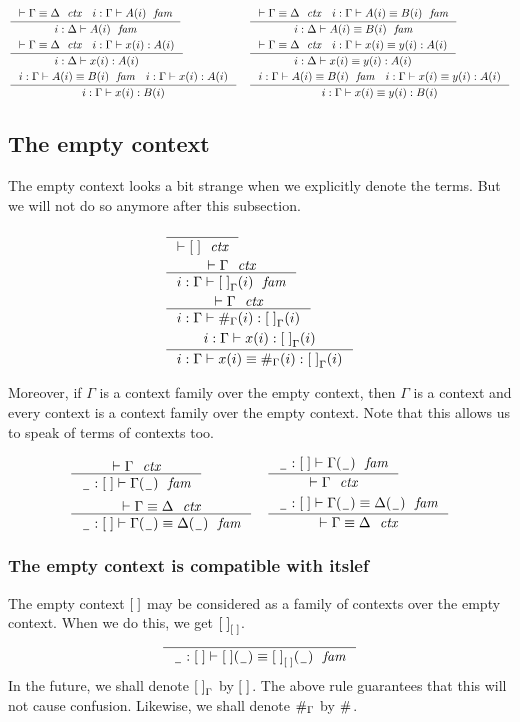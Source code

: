 \begin{align*}
& \inference
  {\jvctxeq{\Gamma}{\Delta}
   \jvfam{i}{\Gamma}{A}}
  {\jvfam{i}{\Delta}{A}}
& & \inference
    {\jvctxeq{\Gamma}{\Delta}
     \jvfameq{i}{\Gamma}{A}{B}}
    {\jvfameq{i}{\Delta}{A}{B}}\\
& \inference
  {\jvctxeq{\Gamma}{\Delta}
   \jvterm{i}{\Gamma}{A}{x}}
  {\jvterm{i}{\Delta}{A}{x}}
& & \inference
    {\jvctxeq{\Gamma}{\Delta}
     \jvtermeq{i}{\Gamma}{A}{x}{y}}
    {\jvtermeq{i}{\Delta}{A}{x}{y}}\\
& \inference
  {\jvfameq{i}{\Gamma}{A}{B}
   \jvterm{i}{\Gamma}{A}{x}}
  {\jvterm{i}{\Gamma}{B}{x}}
& & \inference
    {\jvfameq{i}{\Gamma}{A}{B}
     \jvtermeq{i}{\Gamma}{A}{x}{y}}
    {\jvtermeq{i}{\Gamma}{B}{x}{y}}
\end{align*}

\subsection{The empty context}
The empty context looks a bit strange when we explicitly denote the terms. But
we will not do so anymore after this subsection.

\begin{align}
& \inference
  {}
  {\jctx{\emptyc}}\\
& \inference
  {\jctx{\Gamma}}
  {\jvfam{i}{\Gamma}{\emptyf[\Gamma]}}\\
& \inference
  {\jctx{\Gamma}}
  {\jvterm{i}{\Gamma}{\emptyf[\Gamma]}{\emptytm[\Gamma]}}\\
& \inference
  {\jvterm{i}{\Gamma}{\emptyf[\Gamma]}{x}}
  {\jvtermeq{i}{\Gamma}{\emptyf[\Gamma]}{x}{\emptytm[\Gamma]}}
\end{align}

Moreover, if $\Gamma$ is a context family over the
empty context, then $\Gamma$ is a context and every context is a context
family over the empty context. Note that this allows us to speak
of terms of contexts too.

\begin{align}
& \inference
  {\jctx{\Gamma}}
  {\jvfam{\nameless}{\emptyc}{\Gamma}} 
& & \inference
    {\jvfam{\nameless}{\emptyc}{\Gamma}}
    {\jctx{\Gamma}}\\
& \inference
  {\jctxeq{\Gamma}{\Delta}}
  {\jvfameq{\nameless}{\emptyc}{\Gamma}{\Delta}}
& & \inference
    {\jvfameq{\nameless}{\emptyc}{\Gamma}{\Delta}}
    {\jctxeq{\Gamma}{\Delta}}
\end{align}

\subsubsection{The empty context is compatible with itslef}
The empty context $\emptyc$ may be considered as a family of contexts over the empty
context. When we do this, we get $\emptyf[\emptyc]$.
\begin{equation}
\inference
  {}
  {\jvfameq{\nameless}{\emptyc}{\emptyc}{\emptyf[\emptyc]}}
\end{equation}
In the future, we shall denote $\emptyf[\Gamma]$ by $\emptyf$. The above rule
guarantees that this will not cause confusion. Likewise, we shall denote
$\emptytm[\Gamma]$ by $\emptytm$.

